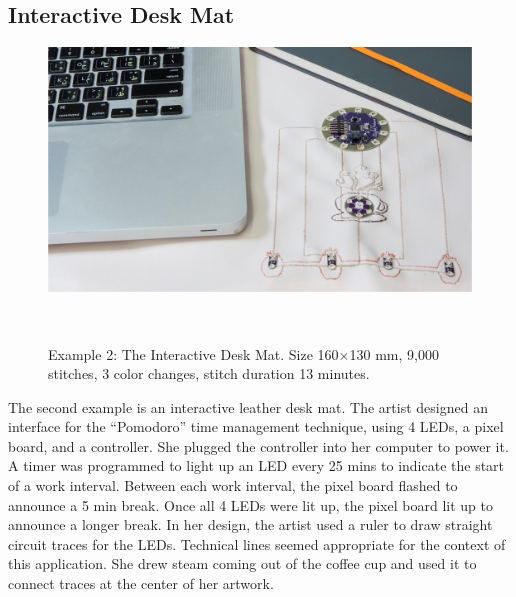 \documentclass{sigchi}
\begin{document}
\subsection{Interactive Desk Mat}
\begin{figure} [h!]
\centering
  \includegraphics[width=1\columnwidth]{figures/DeskMat}
  \caption{Example 2: The Interactive Desk Mat. Size 160$\times$130 mm, 9,000 stitches, 3 color changes, stitch duration 13 minutes.}~\label{fig:DeskMat}
  \vspace{-1.5em}
\end{figure}
The second example is an interactive leather desk mat. The artist designed an interface for the ``Pomodoro'' time management technique, using 4 LEDs, a pixel board, and a controller. She plugged the controller into her computer to power it. A timer was programmed to light up an LED every 25 mins to indicate the start of a work interval. Between each work interval, the pixel board flashed to announce a 5 min break. Once all 4 LEDs were lit up, the pixel board lit up to announce a longer break. In her design, the artist used a ruler to draw straight circuit traces for the LEDs. Technical lines seemed appropriate for the context of this application. She drew steam coming out of the coffee cup and used it to connect traces at the center of her artwork. 
\end{document}
